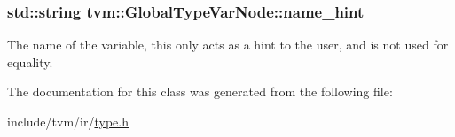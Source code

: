 \subsubsection[{\texorpdfstring{name\+\_\+hint}{name_hint}}]{\setlength{\rightskip}{0pt plus 5cm}std\+::string tvm\+::\+Global\+Type\+Var\+Node\+::name\+\_\+hint}\hypertarget{classtvm_1_1GlobalTypeVarNode_a9a4ba707c819bf2e29d9b58c72047a1b}{}\label{classtvm_1_1GlobalTypeVarNode_a9a4ba707c819bf2e29d9b58c72047a1b}


The name of the variable, this only acts as a hint to the user, and is not used for equality. 



The documentation for this class was generated from the following file\+:\begin{DoxyCompactItemize}
\item 
include/tvm/ir/\hyperlink{ir_2type_8h}{type.\+h}\end{DoxyCompactItemize}
